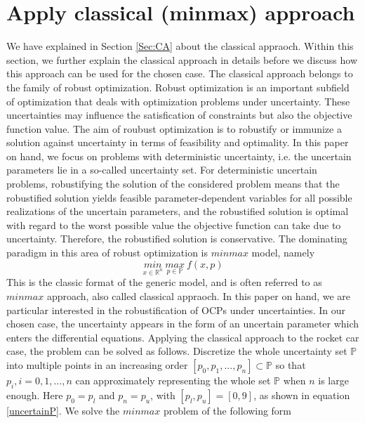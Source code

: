 \documentclass  [
  paper    = a4,
  BCOR     = 10mm,
  twoside,
  fontsize = 12pt,
  fleqn,
  toc      = bibnumbered,
  toc      = listofnumbered,
  numbers  = noendperiod,
  headings = normal,
  listof   = leveldown,
  version  = 3.03
]                                       {scrreprt}
\newcommand{\<}{\langle}
\renewcommand{\>}{\rangle}
\begin{document}
\section{Apply classical (minmax) approach}
We have explained in Section \ref{Sec:CA} about the classical appraoch. Within this section, we further explain the classical approach in details before we discuss how this approach can be used for the chosen case. 
The classical approach belongs to the family of robust optimization. Robust optimization is an important subfield of optimization that deals with optimization problems under uncertainty. These uncertainties may influence the satisfication of constraints but also the objective function value. The aim of roubust optimization is to robustify or immunize a solution against uncertainty in terms of feasibility and optimality.  In this paper on hand, we focus on problems with deterministic uncertainty, i.e. the uncertain parameters lie in a so-called uncertainty set. For deterministic uncertain problems, robustifying the solution of the considered problem means that the robustified solution yields feasible parameter-dependent variables for all possible realizations of the uncertain parameters, and the robustified solution is optimal with regard to the worst possible value the objective function can take due to uncertainty. Therefore, the robustified solution is conservative. The dominating paradigm in this area of robust optimization is $minmax$ model, namely
\begin{equation}
	\underset{x \in \mathbb{R}^n}{min} \   \underset{p \in \mathbb{P}}{max}  \  f(x,p) 
\end{equation}
This is the classic format of the generic model, and is often referred to as $minmax$ approach, also called classical appraoch. 
In this paper on hand, we are particular interested in the robustification of OCPs under uncertainties. In our chosen case, the uncertainty appears in the form of an uncertain parameter which enters the differential equations.  Applying the classical approach to the rocket car case, the problem can be solved as follows. Discretize the whole uncertainty set  $\mathbb{P}$ into multiple points in an increasing order $[p_0, p_1, ..., p_n] \subset \mathbb{P}$ so that $p_i, i =0, 1, ..., n$ can approximately representing the whole set  $\mathbb{P}$ when $n$ is large enough. Here $p_0=p_l$ and $p_n= p_u$, with $[p_l, p_u] =[0,9]$, as shown in equation \ref{uncertainP}.  We solve the $minmax$ problem of the following form
\end{document}
